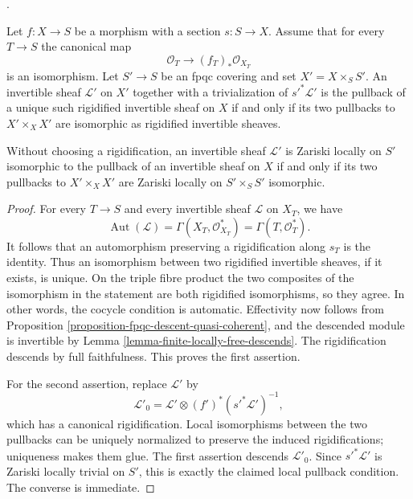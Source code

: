 \begin{lemma}
\label{lemma-rigidified-invertible-fpqc-descent}
\begin{reference}
\cite[Expos\'e 190, n\textsuperscript{o} 4, pp. 322--323]{FGA}.
\end{reference}
Let $f : X \to S$ be a morphism with a section $s : S \to X$. Assume that
for every $T \to S$ the canonical map
$$
\mathcal{O}_T \longrightarrow (f_T)_*\mathcal{O}_{X_T}
$$
is an isomorphism. Let $S' \to S$ be an fpqc covering and set
$X' = X \times_S S'$. An invertible sheaf $\mathcal{L}'$ on $X'$ together
with a trivialization of $s'^*\mathcal{L}'$ is the pullback of a unique such
rigidified invertible sheaf on $X$ if and only if its two pullbacks to
$X' \times_X X'$ are isomorphic as rigidified invertible sheaves.

Without choosing a rigidification, an invertible sheaf $\mathcal{L}'$ is
Zariski locally on $S'$ isomorphic to the pullback of an invertible sheaf on
$X$ if and only if its two pullbacks to $X' \times_X X'$ are Zariski locally
on $S' \times_S S'$ isomorphic.
\end{lemma}

\begin{proof}
For every $T \to S$ and every invertible sheaf $\mathcal{L}$ on $X_T$, we
have
$$
\operatorname{Aut}(\mathcal{L}) =
\Gamma(X_T, \mathcal{O}_{X_T}^*) =
\Gamma(T, \mathcal{O}_T^*).
$$
It follows that an automorphism preserving a rigidification along $s_T$ is
the identity. Thus an isomorphism between two rigidified invertible sheaves,
if it exists, is unique. On the triple fibre product the two composites of
the isomorphism in the statement are both rigidified isomorphisms, so they
agree. In other words, the cocycle condition is automatic. Effectivity now
follows from Proposition \ref{proposition-fpqc-descent-quasi-coherent}, and
the descended module is invertible by
Lemma \ref{lemma-finite-locally-free-descends}. The rigidification descends by
full faithfulness. This proves the first assertion.

For the second assertion, replace $\mathcal{L}'$ by
$$
\mathcal{L}'_0 =
\mathcal{L}' \otimes (f')^*(s'^*\mathcal{L}')^{-1},
$$
which has a canonical rigidification. Local isomorphisms between the two
pullbacks can be uniquely normalized to preserve the induced
rigidifications; uniqueness makes them glue. The first assertion descends
$\mathcal{L}'_0$. Since $s'^*\mathcal{L}'$ is Zariski locally trivial on
$S'$, this is exactly the claimed local pullback condition. The converse is
immediate.
\end{proof}


